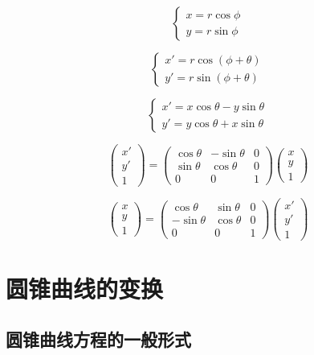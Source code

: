 \[
  \begin{cases}
    x = r\cos\phi\\
    y = r\sin\phi
  \end{cases}
\]

\[
  \begin{cases}
    x' = r\cos(\phi+\theta)\\
    y' = r\sin(\phi+\theta)
  \end{cases}
\]

\[
  \begin{cases}
    x' = x\cos\theta-y\sin\theta\\
    y' = y\cos\theta+x\sin\theta
  \end{cases}
\]

\[
  \begin{pmatrix}
    x'\\
    y'\\
    1
  \end{pmatrix}
  =
  \begin{pmatrix}
    \cos\theta & -\sin\theta & 0\\
    \sin\theta & \cos\theta & 0\\
    0 & 0 & 1
  \end{pmatrix}
  \begin{pmatrix}
    x\\
    y\\
    1
  \end{pmatrix}
\]

\[
  \begin{pmatrix}
    x\\
    y\\
    1
  \end{pmatrix}
  =
  \begin{pmatrix}
    \cos\theta & \sin\theta & 0\\
    -\sin\theta & \cos\theta & 0\\
    0 & 0 & 1
  \end{pmatrix}
  \begin{pmatrix}
    x'\\
    y'\\
    1
  \end{pmatrix}
\]

\section{圆锥曲线的变换}

\subsection{圆锥曲线方程的一般形式}

